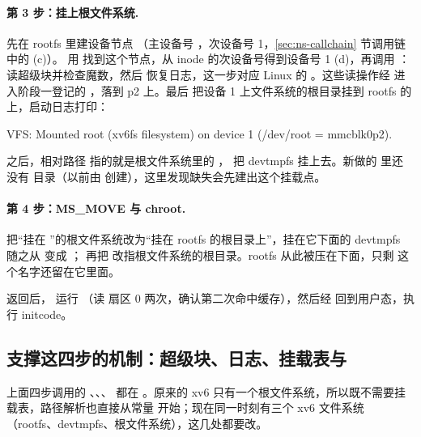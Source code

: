 \paragraph{第 3 步：挂上根文件系统.} 先在 rootfs 里建设备节点 （主设备号 ，次设备号 1，\ref{sec:ns-callchain} 节调用链中的 (c)）。 用  找到这个节点，从 inode 的次设备号得到设备号 1 (d)，再调用 ：读超级块并检查魔数，然后  恢复日志，这一步对应 Linux 的 。这些读操作经  进入阶段一登记的 ，落到 p2 上。最后  把设备 1 上文件系统的根目录挂到 rootfs 的  上，启动日志打印：

\begin{txtcode}
VFS: Mounted root (xv6fs filesystem) on device 1 (/dev/root = mmcblk0p2).
\end{txtcode}

 之后，相对路径  指的就是根文件系统里的 ， 把 devtmpfs 挂上去。新做的  里还没有  目录（以前由  创建），这里发现缺失会先建出这个挂载点。

\paragraph{第 4 步：MS\_MOVE 与 chroot.}  把“挂在 ”的根文件系统改为“挂在 rootfs 的根目录上”，挂在它下面的 devtmpfs 随之从  变成 ； 再把 \code{/} 改指根文件系统的根目录。rootfs 从此被压在下面，只剩  这个名字还留在它里面。

 返回后， 运行 （读  扇区 0 两次，确认第二次命中缓存），然后经  回到用户态，执行 initcode。

\subsection{支撑这四步的机制：超级块、日志、挂载表与 }
\label{sec:ns-mech}

上面四步调用的 、、、 都在 。原来的 xv6 只有一个根文件系统，所以既不需要挂载表，路径解析也直接从常量  开始；现在同一时刻有三个 xv6 文件系统（rootfs、devtmpfs、根文件系统），这几处都要改。

